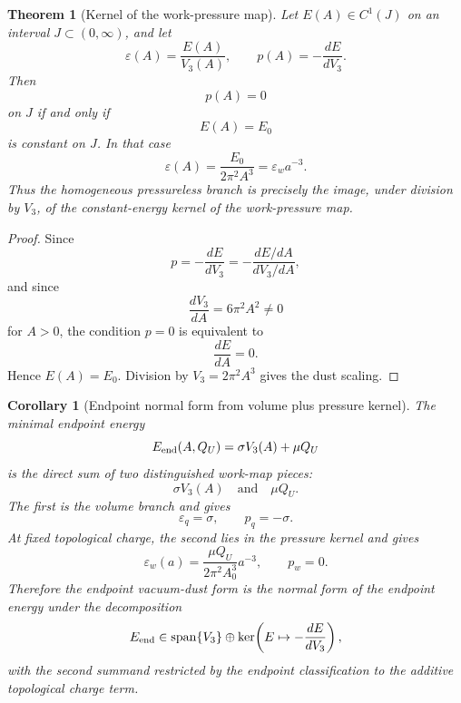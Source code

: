 \documentclass[11pt,a4paper]{article}
\def\dd{d}%
\def\QU{Q_U}%
\numberwithin{equation}{section}
\theoremstyle{definition}
\theoremstyle{plain}
\newtheorem{theorem}[criterion]{Theorem}
\newtheorem{corollary}[criterion]{Corollary}
\theoremstyle{remark}
\newcommand{\dd}{\mathrm{d}}
\newcommand{\QU}{Q_U}
\begin{document}
\begin{theorem}[Kernel of the work-pressure map]
Let \(E(A)\in C^1(J)\) on an interval \(J\subset(0,\infty)\), and let
\begin{equation}
\varepsilon(A)=\frac{E(A)}{V_3(A)},
\qquad
p(A)=-\frac{\dd E}{\dd V_3}.
\end{equation}
Then
\begin{equation}
p(A)=0
\end{equation}
on \(J\) if and only if
\begin{equation}
E(A)=E_0
\end{equation}
is constant on \(J\). In that case
\begin{equation}
\varepsilon(A)=\frac{E_0}{2\pi^2A^3}
=\varepsilon_w a^{-3}.
\end{equation}
Thus the homogeneous pressureless branch is precisely the image, under division by \(V_3\), of the constant-energy kernel of the work-pressure map.
\end{theorem}
\begin{proof}
Since
\begin{equation}
p=-\frac{\dd E}{\dd V_3}
=-\frac{\dd E/\dd A}{\dd V_3/\dd A},
\end{equation}
and since
\begin{equation}
\frac{\dd V_3}{\dd A}=6\pi^2A^2\neq0
\end{equation}
for \(A>0\), the condition \(p=0\) is equivalent to
\begin{equation}
\frac{\dd E}{\dd A}=0.
\end{equation}
Hence \(E(A)=E_0\). Division by \(V_3=2\pi^2A^3\) gives the dust scaling.
\end{proof}

\begin{corollary}[Endpoint normal form from volume plus pressure kernel]
The minimal endpoint energy
\begin{equation}
E_{\rm end}(A,\QU)=\sigma V_3(A)+\mu\QU
\end{equation}
is the direct sum of two distinguished work-map pieces:
\begin{equation}
\sigma V_3(A)
\quad\text{and}\quad
\mu\QU.
\end{equation}
The first is the volume branch and gives
\begin{equation}
\varepsilon_q=\sigma,
\qquad
p_q=-\sigma.
\end{equation}
At fixed topological charge, the second lies in the pressure kernel and gives
\begin{equation}
\varepsilon_w(a)=\frac{\mu\QU}{2\pi^2A_0^3}a^{-3},
\qquad
p_w=0.
\end{equation}
Therefore the endpoint vacuum-dust form is the normal form of the endpoint energy under the decomposition
\begin{equation}
E_{\rm end}
\in
\operatorname{span}\{V_3\}
\oplus
\ker\!\left(E\mapsto-\frac{\dd E}{\dd V_3}\right),
\end{equation}
with the second summand restricted by the endpoint classification to the additive topological charge term.
\end{corollary}
\end{document}
